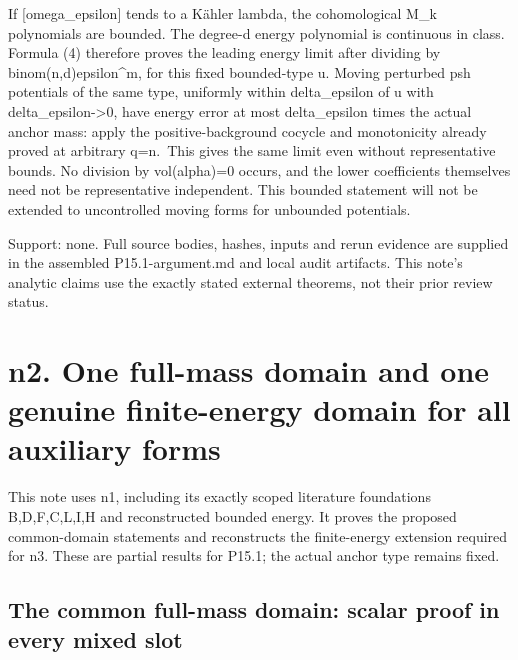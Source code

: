 \documentclass[
]{article}
\begin{document}
If {[}omega\_epsilon{]} tends to a Kähler lambda, the cohomological M\_k
polynomials are bounded. The degree-d energy polynomial is continuous in
class. Formula (4) therefore proves the leading energy limit after
dividing by binom(n,d)epsilon\^{}m, for this fixed bounded-type u.
Moving perturbed psh potentials of the same type, uniformly within
delta\_epsilon of u with delta\_epsilon-\textgreater0, have energy error
at most delta\_epsilon times the actual anchor mass: apply the
positive-background cocycle and monotonicity already proved at arbitrary
q=n.~This gives the same limit even without representative bounds. No
division by vol(alpha)=0 occurs, and the lower coefficients themselves
need not be representative independent. This bounded statement will not
be extended to uncontrolled moving forms for unbounded potentials.

Support: none. Full source bodies, hashes, inputs and rerun evidence are
supplied in the assembled P15.1-argument.md and local audit artifacts.
This note's analytic claims use the exactly stated external theorems,
not their prior review status.

\section{n2. One full-mass domain and one genuine finite-energy domain
for all auxiliary
forms}\label{n2.-one-full-mass-domain-and-one-genuine-finite-energy-domain-for-all-auxiliary-forms}

This note uses n1, including its exactly scoped literature foundations
B,D,F,C,L,I,H and reconstructed bounded energy. It proves the proposed
common-domain statements and reconstructs the finite-energy extension
required for n3. These are partial results for P15.1; the actual anchor
type remains fixed.

\subsection{The common full-mass domain: scalar proof in every mixed
slot}\label{the-common-full-mass-domain-scalar-proof-in-every-mixed-slot}
\end{document}
